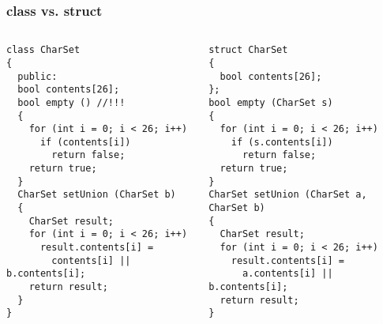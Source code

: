 \documentclass{beamer}
\begin{document}
\begin{frame}[fragile]
\frametitle{class vs. struct}





\begin{columns}[t]
  \begin{column}{0.5\textwidth}
\begin{flushleft}
\begin{lstlisting}
class CharSet
{
  public:
  bool contents[26];
  bool empty () //!!!
  {
    for (int i = 0; i < 26; i++)
      if (contents[i])
        return false;
    return true;
  }
  CharSet setUnion (CharSet b)
  {
    CharSet result;
    for (int i = 0; i < 26; i++)
      result.contents[i] =
        contents[i] || b.contents[i];
    return result;
  }
}
\end{lstlisting}
\end{flushleft}
  \end{column}
  \begin{column}{0.5\textwidth}
\begin{flushleft}
\begin{lstlisting}
struct CharSet
{
  bool contents[26];
};
bool empty (CharSet s)
{
  for (int i = 0; i < 26; i++)
    if (s.contents[i])
      return false;
  return true;
}
CharSet setUnion (CharSet a, CharSet b)
{
  CharSet result;
  for (int i = 0; i < 26; i++)
    result.contents[i] =
      a.contents[i] || b.contents[i];
  return result;
}
\end{lstlisting}
\end{flushleft}

  \end{column}
\end{columns}


\end{frame}
\end{document}

